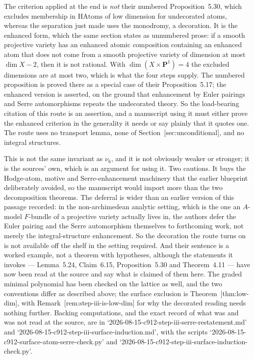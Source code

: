 \documentclass[11pt]{article}
\theoremstyle{definition}
\theoremstyle{remark}
\newcommand{\PP}{\mathbf P}
\begin{document}
The criterion applied at the end is \emph{not} their numbered Proposition~5.30,
which excludes membership in $\mathrm{HAtoms}$ of low dimension for undecorated
atoms, whereas the separation just made uses the monodromy, a decoration. It is
the enhanced form, which the same section states as unnumbered prose: if a smooth
projective variety has an enhanced atomic composition containing an enhanced atom
that does not come from a smooth projective variety of dimension at most
$\dim X-2$, then it is not rational. With $\dim(X\times\PP^1)=4$ the excluded
dimensions are at most two, which is what the four steps supply. The numbered
proposition is proved there as a special case of their Proposition~5.17; the
enhanced version is asserted, on the ground that enhancement by Euler pairings
and Serre automorphisms repeats the undecorated theory. So the load-bearing
citation of this route is an assertion, and a manuscript using it must either
prove the enhanced criterion in the generality it needs or say plainly that it
quotes one. The route uses no transport lemma, none of
Section~\textup{[sec:unconditional]}, and no integral structures.

This is not the same invariant as $\nu_6$, and it is not obviously weaker or
stronger; it is the sources' own, which is an argument for using it. Two
cautions. It buys the Hodge-atom, motive and Serre-enhancement machinery that
the earlier blueprint deliberately avoided, so the manuscript would import more
than the two decomposition theorems. The deferral is wider than an earlier
version of this passage recorded: in the non-archimedean analytic setting, which
is the one an $A$-model $F$-bundle of a projective variety actually lives in, the
authors defer the Euler pairing and the Serre automorphism themselves to
forthcoming work, not merely the integral-structure enhancement. So the
decoration the route turns on is not available off the shelf in the setting
required. And their sentence is a worked example,
not a theorem with hypotheses, although the statements it invokes ---
Lemma~5.24, Claim~6.15, Proposition~5.30 and Theorem~4.11 --- have now been read
at the source and say what is claimed of them here. The graded minimal
polynomial has been checked on the lattice as well, and the two conventions
differ as described above; the surface exclusion is
Theorem~\textup{[thm:low-dim]}, with Remark~\textup{[rem:step-iii-is-low-dim]} for why the
decorated reading needs nothing further.
Backing computations, and the exact record of what was and was not read at the
source, are in `2026-08-15-c912-step-iii-serre-restatement.md' and
`2026-08-15-c912-step-iii-surface-induction.md', with the scripts
`2026-08-15-c912-surface-atom-serre-check.py' and
`2026-08-15-c912-step-iii-surface-induction-check.py'.
\end{document}
